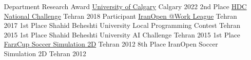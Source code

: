 



\begin{cvhonors}
\cvhonor
{Department Research Award} %
{\href{https://science.ucalgary.ca/computer-science/future-students/graduate/awards-and-scholarships}{University of Calgary}} %
{Calgary} %
{2022}
\cvhonor
{2nd Place} %
{\href{http://fpgasoc.sbu.ac.ir/}{HDC National Challenge}} %
{Tehran} %
{2018}
\cvhonor
{Participant} %
{\href{https://www.robocup.org/leagues/16}{IranOpen @Work League}} %
{Tehran} %
{2017}
\cvhonor
{1st Place} %
{Shahid Beheshti University Local Programming Contest} %
{Tehran} %
{2015}
\cvhonor
{1st Place} %
{Shahid Beheshti University AI Challenge} %
{Tehran} %
{2015}
\cvhonor
{1st Place} %
{\href{http://farzcup.farz1.ir/en/}{FarzCup Soccer Simulation 2D}} %
{Tehran} %
{2012}
\cvhonor
{8th Place} %
{IranOpen Soccer Simulation 2D} %
{Tehran} %
{2012}


\end{cvhonors}
